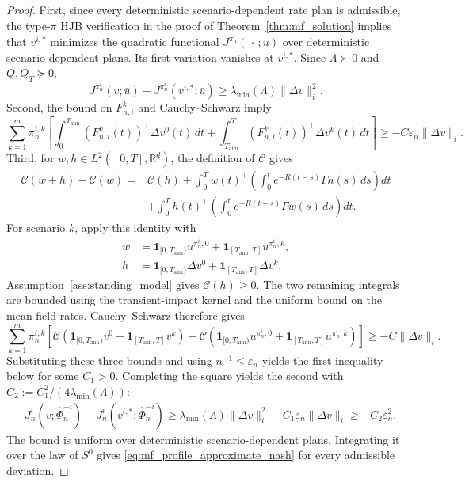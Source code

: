 \documentclass[12pt]{article}
\numberwithin{equation}{section}
\theoremstyle{definition}
\begin{document}
\begin{proof}
First, since every deterministic scenario-dependent rate plan is admissible,
the type-\(\pi\) HJB verification in the proof of
Theorem~\ref{thm:mf_solution} implies that \(v^{i,*}\) minimizes the
quadratic functional \(J^{\pi_n^i}(\,\cdot\,;\bar u)\) over deterministic
scenario-dependent plans. Its first variation vanishes at \(v^{i,*}\). Since
\(\Lambda\succ0\) and \(Q,Q_T\succeq0\),
\[
J^{\pi_n^i}(v;\bar u)
-J^{\pi_n^i}(v^{i,*};\bar u)
\geq
\lambda_{\min}(\Lambda)\|\Delta v\|_i^2.
\]
Second, the bound on \(F_{n,i}^k\) and Cauchy--Schwarz imply
\[
\sum_{k=1}^m\pi_n^{i,k}
\left[
\int_0^{T_{\mathrm{ann}}}
\left(F_{n,i}^k(t)\right)^\top\Delta v^0(t)\,dt
+
\int_{T_{\mathrm{ann}}}^T
\left(F_{n,i}^k(t)\right)^\top\Delta v^k(t)\,dt
\right]
\geq
-C\varepsilon_n\|\Delta v\|_i.
\]
Third, for \(w,h\in L^2([0,T],\mathbb R^d)\), the definition of
\(\mathcal C\) gives
\[
\begin{aligned}
\mathcal C(w+h)-\mathcal C(w)
={}&
\mathcal C(h)
+
\int_0^T
w(t)^\top
\left(
\int_0^t e^{-R(t-s)}\Gamma h(s)\,ds
\right)dt
\\
&+
\int_0^T
h(t)^\top
\left(
\int_0^t e^{-R(t-s)}\Gamma w(s)\,ds
\right)dt.
\end{aligned}
\]
For scenario \(k\), apply this identity with
\[
\begin{aligned}
w
&=
\mathbf 1_{[0,T_{\mathrm{ann}})}u^{\pi_n^i,0}
+\mathbf 1_{[T_{\mathrm{ann}},T]}u^{\pi_n^i,k},
\\
h
&=
\mathbf 1_{[0,T_{\mathrm{ann}})}\Delta v^0
+\mathbf 1_{[T_{\mathrm{ann}},T]}\Delta v^k.
\end{aligned}
\]
Assumption~\ref{ass:standing_model} gives \(\mathcal C(h)\geq0\). The two
remaining integrals are bounded using the transient-impact kernel and the
uniform bound on the mean-field rates. Cauchy--Schwarz therefore gives
\[
\sum_{k=1}^m\pi_n^{i,k}
\left[
\mathcal C\left(
\mathbf 1_{[0,T_{\mathrm{ann}})}v^0
+\mathbf 1_{[T_{\mathrm{ann}},T]}v^k
\right)
-\mathcal C\left(
\mathbf 1_{[0,T_{\mathrm{ann}})}u^{\pi_n^i,0}
+\mathbf 1_{[T_{\mathrm{ann}},T]}u^{\pi_n^i,k}
\right)
\right]
\geq
-C\|\Delta v\|_i.
\]
Substituting these three bounds and using \(n^{-1}\leq\varepsilon_n\) yields
the first inequality below for some \(C_1>0\). Completing the square yields
the second with \(C_2:=C_1^2/(4\lambda_{\min}(\Lambda))\):
\[
\begin{aligned}
&J_n^i(v;\widehat\Phi_n^{-i})
-J_n^i(v^{i,*};\widehat\Phi_n^{-i})
\geq \lambda_{\min}(\Lambda)\|\Delta v\|_i^2-C_1\varepsilon_n\|\Delta v\|_i
\geq -C_2\varepsilon_n^2.
\end{aligned}
\]
The bound is uniform over deterministic scenario-dependent plans. Integrating it over
the law of \(S^0\) gives
\eqref{eq:mf_profile_approximate_nash} for every admissible deviation.
\end{proof}
\end{document}

